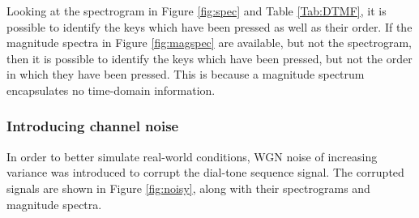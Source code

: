 Looking at the spectrogram in Figure \ref{fig:spec} and Table \ref{Tab:DTMF}, it is possible to identify the keys which have been pressed as well as their order. If the magnitude spectra in Figure \ref{fig:magspec} are available, but not the spectrogram, then it is possible to identify the keys which have been pressed, but not the order in which they have been pressed. This is because a magnitude spectrum encapsulates no time-domain information. 

\subsubsection{Introducing channel noise}

In order to better simulate real-world conditions, WGN noise of increasing variance was introduced to corrupt the dial-tone sequence signal. The corrupted signals are shown in Figure \ref{fig:noisy}, along with their spectrograms and magnitude spectra.

